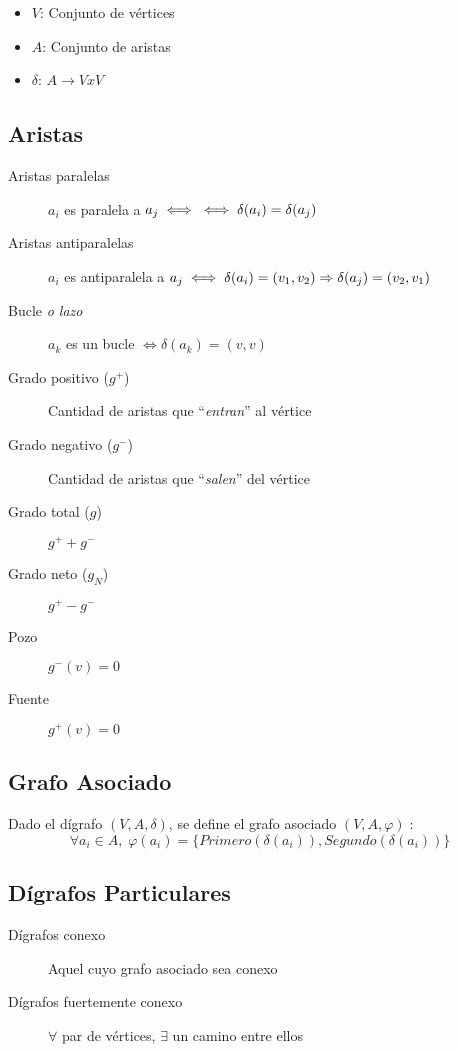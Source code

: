 \documentclass[a4paper,twocolumn]{article}
\numberwithin{equation}{section}
\numberwithin{figure}{section}
\numberwithin{table}{section}
\newcommand{\refa}[1]{}
\newcommand{\talque}{\;:\,} %
\begin{document}
\begin{itemize}
	\item $V$: Conjunto de v\'ertices
    \item $A$: Conjunto de aristas
    \item $\delta $: $A \to VxV$
\end{itemize}

\subsection{Aristas}
\begin{description}
	\item[Aristas paralelas] $a_i$ es paralela a $a_j \iff \\ \iff \delta(a_i) = \delta(a_j)$
    \item[Aristas antiparalelas] $a_i$ es antiparalela a $a_j \\ \iff \delta(a_i) = (v_1, v_2) \Rightarrow  \delta(a_j) = (v_2, v_1)$
    \item[Bucle \emph{o lazo}] $a_k$ es un bucle $\iff \delta(a_k) = (v,v)$
	\item[Grado positivo ($g^+$)] Cantidad de aristas que ``\emph{entran}'' al v\'ertice
    \item[Grado negativo ($g^-$)] Cantidad de aristas que ``\emph{salen}'' del v\'ertice
    \item[Grado total ($g$)] $g^+ + g^-$
    \item[Grado neto ($g_N$)] $g^+ - g^-$
    \item[Pozo] $g^-(v) = 0$
    \item[Fuente] $g^+(v) = 0$
\end{description}

\subsection{Grafo Asociado}
Dado el d\'igrafo $(V,A,\delta)$, se define el grafo asociado $(V,A,\varphi)\talque$
$$
	\forall a_i \in A,\; \varphi(a_i) = \{Primero(\delta(a_i)), Segundo(\delta(a_i))\}
$$

\subsection{D\'igrafos Particulares}
\begin{description}
	\item[D\'igrafos conexo] Aquel cuyo grafo asociado sea conexo\refa{conexo}
    \item[D\'igrafos fuertemente conexo] $\forall$ par de v\'ertices, $\exists$ un camino\refa{camino} entre ellos
\end{description}
\end{document}
